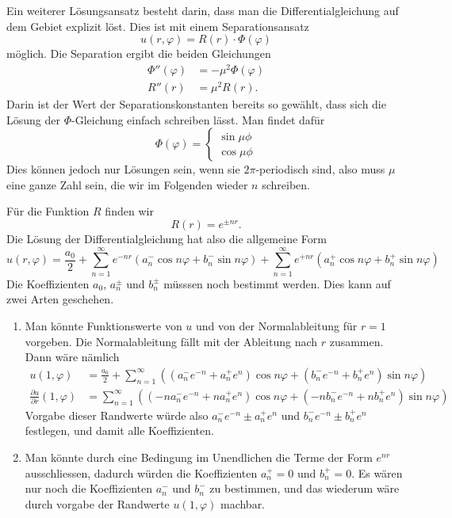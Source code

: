 \begin{loesung}
Ein weiterer Lösungsansatz besteht darin, dass man die Differentialgleichung
auf dem Gebiet explizit löst.
Dies ist mit einem Separationsansatz
\[
u(r,\varphi) = R(r) \cdot \Phi(\varphi)
\]
möglich.
Die Separation ergibt die beiden Gleichungen
\begin{align*}
\Phi''(\varphi)&=-\mu^2\Phi(\varphi)
\\
R''(r)&=\mu^2R(r).
\end{align*}
Darin ist der Wert der Separationskonstanten bereits so gewählt, dass sich
die Lösung der $\Phi$-Gleichung einfach schreiben lässt.
Man findet dafür
\[
\Phi(\varphi) =
\begin{cases}
\sin\mu\phi\\
\cos\mu\phi
\end{cases}
\]
Dies können jedoch nur Lösungen sein, wenn sie $2\pi$-periodisch sind,
also muss $\mu$ eine ganze Zahl sein, die wir im Folgenden wieder $n$
schreiben.

Für die Funktion $R$ finden wir
\[
R(r) = e^{\pm nr}.
\]
Die Lösung der Differentialgleichung hat also die allgemeine
Form
\[
u(r,\varphi)
=
\frac{a_0}2
+
\sum_{n=1}^\infty
e^{-nr}(a_n^- \cos n\varphi + b_n^- \sin n\varphi)
+
\sum_{n=1}^\infty
e^{+nr}(a_n^+ \cos n\varphi + b_n^+ \sin n\varphi)
\]
Die Koeffizienten $a_0$, $a_n^\pm$ und $b_n^\pm$ müsssen noch bestimmt
werden.
Dies kann auf zwei Arten geschehen.
\begin{enumerate}
\item Man könnte Funktionswerte von $u$ und von der Normalableitung für
$r=1$ vorgeben.
Die Normalableitung fällt mit der Ableitung nach $r$ zusammen.
Dann wäre nämlich
\begin{align*}
u(1,\varphi)
&=
\frac{a_0}2
+
\sum_{n=1}^\infty ((a_n^-e^{-n}+a_n^+e^n)\cos n\varphi + (b_n^-e^{-n}+b_n^+e^n)\sin n\varphi)
\\
\frac{\partial u}{\partial r}(1,\varphi)
&=
\sum_{n=1}^\infty ((-na_n^-e^{-n}+na_n^+e^n)\cos n\varphi + (-nb_n^-e^{-n}+nb_n^+e^n)\sin n\varphi)
\end{align*}
Vorgabe dieser Randwerte würde also $a_n^-e^{-n}\pm a_n^+e^n$ und $b_n^-e^{-n}\pm b_n^+e^n$
festlegen, und damit alle Koeffizienten.
\item
Man könnte durch eine Bedingung im Unendlichen die Terme der Form $e^{nr}$
ausschliessen, dadurch würden die Koeffizienten $a_n^+=0$ und $b_n^+=0$.
Es wären nur noch die Koeffizienten $a_n^-$ und $b_n^-$ zu bestimmen,
und das wiederum wäre durch vorgabe der Randwerte $u(1,\varphi)$
machbar.
\qedhere
\end{enumerate}
\end{loesung}

